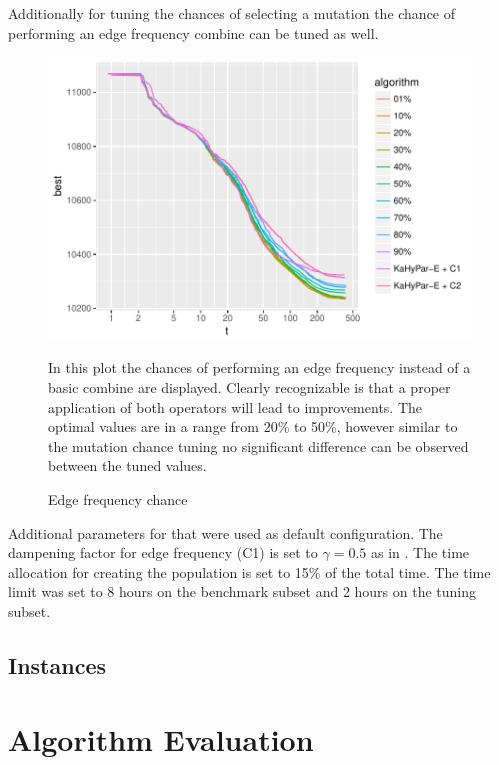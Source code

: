 \documentclass[a4paper,12pt,titlepage, BCOR7mm,headsepline]{scrbook}
\numberwithin{equation}{section}
\begin{document}
Additionally for tuning the chances of selecting a mutation the chance of performing an edge frequency combine can be tuned as well.

\begin{figure}[H]
\caption{Edge frequency chance}
\begin{center}
\includegraphics{bachelorarbeit-edgefrequencytuning}
\end{center}
In this plot the chances of performing an edge frequency instead of a basic combine are displayed. Clearly recognizable is that a proper application of both operators will lead to improvements. The optimal values are in a range from 20\% to 50\%, however similar to the mutation chance tuning no significant difference can be observed between the tuned values.  
\end{figure}
Additional parameters for that were used as default configuration. The dampening factor for edge frequency (C1) is set to $\gamma = 0.5$ as in \cite{wichlund1998multilevel}. The time allocation for creating the population is set to 15\% of the total time. The time limit was set to 8 hours on the benchmark subset and 2 hours on the tuning subset.
\subsection{Instances}

\section{Algorithm Evaluation}
\end{document}
